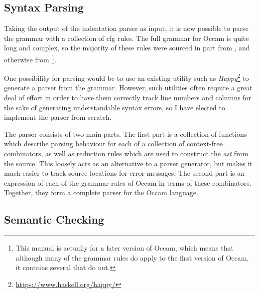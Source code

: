 \subsection{Syntax Parsing}

Taking the output of the indentation parser as input, it is now possible to
parse the grammar with a collection of \gls{cfg} rules. The full grammar for
Occam is quite long and complex, so the majority of these rules were sourced in
part from \cite[p.~124]{jones}, and otherwise from
\cite[p.~106]{occ21}\footnote{This manual is actually for a later version of
Occam, which means that although many of the grammar rules do apply to the first
version of Occam, it contains several that do not.}.

One possibility for parsing would be to use an existing utility such as
\textit{Happy}\footnote{\url{https://www.haskell.org/happy/}} to generate a
parser from the grammar. However, such utilities often require a great deal of
effort in order to have them correctly track line numbers and columns for the
sake of generating understandable syntax errors, so I have elected to implement
the parser from scratch.

The parser consists of two main parts. The first part is a collection of
functions which describe parsing behaviour for each of a collection of
context-free combinators, as well as reduction rules which are used to construct
the \textit{\gls{ast}} from the source. This loosely acts as an alternative to a
parser generator, but makes it much easier to track source locations for error
messages. The second part is an expression of each of the grammar rules of Occam
in terms of these combinators. Together, they form a complete parser for the
Occam language.

\subsection{Semantic Checking}

